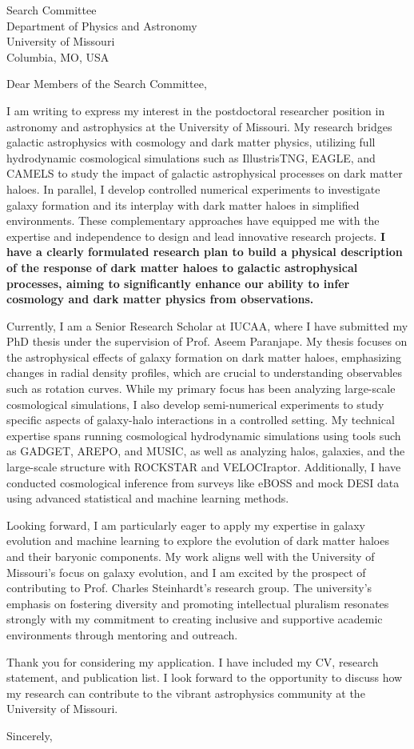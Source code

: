 \documentclass[11pt]{letter}
\begin{document}
\begin{letter}{Search Committee \\ Department of Physics and Astronomy \\ University of Missouri \\ Columbia, MO, USA}

\opening{Dear Members of the Search Committee,}

I am writing to express my interest in the postdoctoral researcher position in astronomy and astrophysics at the University of Missouri. My research bridges galactic astrophysics with cosmology and dark matter physics, utilizing full hydrodynamic cosmological simulations such as IllustrisTNG, EAGLE, and CAMELS to study the impact of galactic astrophysical processes on dark matter haloes. In parallel, I develop controlled numerical experiments to investigate galaxy formation and its interplay with dark matter haloes in simplified environments. These complementary approaches have equipped me with the expertise and independence to design and lead innovative research projects. \textbf{I have a clearly formulated research plan to build a physical description of the response of dark matter haloes to galactic astrophysical processes, aiming to significantly enhance our ability to infer cosmology and dark matter physics from observations.}

Currently, I am a Senior Research Scholar at IUCAA, where I have submitted my PhD thesis under the supervision of Prof. Aseem Paranjape. My thesis focuses on the astrophysical effects of galaxy formation on dark matter haloes, emphasizing changes in radial density profiles, which are crucial to understanding observables such as rotation curves. While my primary focus has been analyzing large-scale cosmological simulations, I also develop semi-numerical experiments to study specific aspects of galaxy-halo interactions in a controlled setting. My technical expertise spans running cosmological hydrodynamic simulations using tools such as GADGET, AREPO, and MUSIC, as well as analyzing halos, galaxies, and the large-scale structure with ROCKSTAR and VELOCIraptor. Additionally, I have conducted cosmological inference from surveys like eBOSS and mock DESI data using advanced statistical and machine learning methods.

Looking forward, I am particularly eager to apply my expertise in galaxy evolution and machine learning to explore the evolution of dark matter haloes and their baryonic components. My work aligns well with the University of Missouri’s focus on galaxy evolution, and I am excited by the prospect of contributing to Prof. Charles Steinhardt’s research group. The university’s emphasis on fostering diversity and promoting intellectual pluralism resonates strongly with my commitment to creating inclusive and supportive academic environments through mentoring and outreach.

Thank you for considering my application. I have included my CV, research statement, and publication list. I look forward to the opportunity to discuss how my research can contribute to the vibrant astrophysics community at the University of Missouri.

\closing{Sincerely,}

\end{letter}
\end{document}
